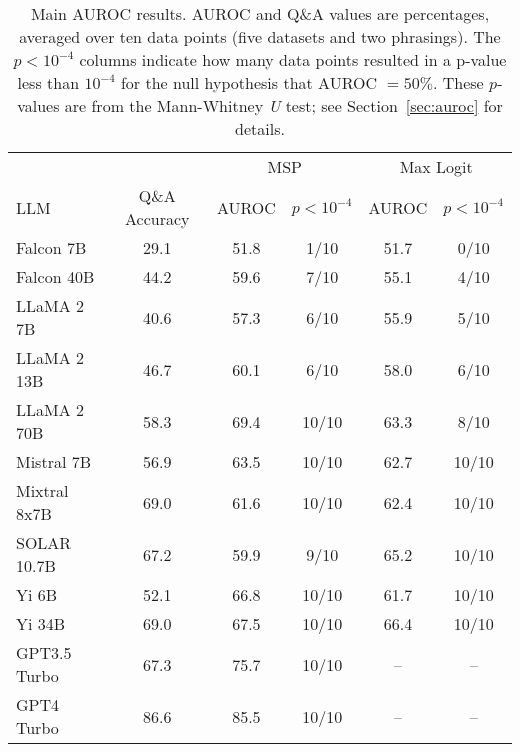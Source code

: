 \begin{table*}
\small
\centering
\caption{Main AUROC results. AUROC and Q\&A values are percentages, averaged over ten data points (five datasets and two phrasings). The $p < 10^{-4}$ columns indicate how many data points resulted in a p-value less than $10^{-4}$ for the null hypothesis that AUROC $= 50\%$. These $p$-values are from the Mann-Whitney \emph{U} test; see Section~\ref{sec:auroc} for details.}
\label{tab:auroc}
\begin{tabular}{lccccc}
\toprule
& & \multicolumn{2}{c}{MSP} & \multicolumn{2}{c}{Max Logit} \\ 
LLM & Q\&A Accuracy & AUROC & $p < 10^{-4}$ & AUROC & $p < 10^{-4}$ \\ 
\cmidrule(lr){1-1} \cmidrule(lr){2-2} \cmidrule(lr){3-4} \cmidrule(lr){5-6} 
Falcon 7B & 29.1 & 51.8 & 1/10 & 51.7 & 0/10 \\
Falcon 40B & 44.2 & 59.6 & 7/10 & 55.1 & 4/10 \\
LLaMA 2 7B & 40.6 & 57.3 & 6/10 & 55.9 & 5/10 \\
LLaMA 2 13B & 46.7 & 60.1 & 6/10 & 58.0 & 6/10 \\
LLaMA 2 70B & 58.3 & 69.4 & 10/10 & 63.3 & 8/10 \\
Mistral 7B & 56.9 & 63.5 & 10/10 & 62.7 & 10/10 \\
Mixtral 8x7B & 69.0 & 61.6 & 10/10 & 62.4 & 10/10 \\
SOLAR 10.7B & 67.2 & 59.9 & 9/10 & 65.2 & 10/10 \\
Yi 6B & 52.1 & 66.8 & 10/10 & 61.7 & 10/10 \\
Yi 34B & 69.0 & 67.5 & 10/10 & 66.4 & 10/10 \\
GPT3.5 Turbo & 67.3 & 75.7 & 10/10 & -- & --\\
GPT4 Turbo & 86.6 & 85.5 & 10/10 & -- & --\\
\bottomrule
\end{tabular}
\end{table*}